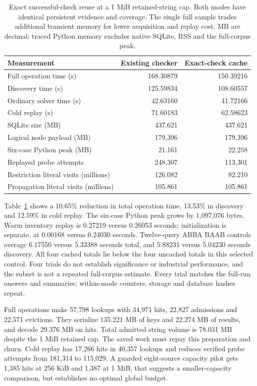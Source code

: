 \documentclass[11pt,a4paper]{article}
\numberwithin{equation}{section}
\theoremstyle{plain}
\theoremstyle{definition}
\theoremstyle{remark}
\begin{document}
\begin{table}[t]
\centering
\small
\begin{tabular}{lrr}
\toprule
Measurement & Existing checker & Exact-check cache \\
\midrule
Full operation time (s) & 168.30879 & 150.39216 \\
Discovery time (s) & 125.59834 & 108.60557 \\
Ordinary solver time (s) & 42.63160 & 41.72166 \\
Cold replay (s) & 71.60183 & 62.58623 \\
SQLite size (MB) & 437.621 & 437.621 \\
Logical node payload (MB) & 179.396 & 179.396 \\
Six-case Python peak (MB) & 21.161 & 22.258 \\
Replayed probe attempts & 248,307 & 113,301 \\
Restriction literal visits (millions) & 126.082 & 82.210 \\
Propagation literal visits (millions) & 105.861 & 105.861 \\
\bottomrule
\end{tabular}
\caption{Exact successful-check reuse at a 1 MiB retained-string cap. Both modes have identical persistent evidence and coverage. The single full sample trades additional transient memory for lower acquisition and replay cost. MB are decimal; traced Python memory excludes native SQLite, RSS and the full-corpus peak.}
\label{tab:checked-probe-reuse}
\end{table}

Table~\ref{tab:checked-probe-reuse} shows a 10.65\% reduction in total operation time, 13.53\% in discovery and 12.59\% in cold replay. The six-case Python peak grows by 1,097,076 bytes. Warm inventory replay is 0.27219 versus 0.26053 seconds; initialization is separate, at 0.00168 versus 0.24030 seconds. Twelve-query ABBA BAAB controls average 6.17550 versus 5.33388 seconds total, and 5.88231 versus 5.04230 seconds discovery. All four cached totals lie below the four uncached totals in this selected control. Four trials do not establish significance or industrial performance, and the subset is not a repeated full-corpus estimate. Every trial matches the full-run answers and summaries; within-mode counters, storage and database hashes repeat.

Full operations make 57,798 lookups with 34,971 hits, 22,827 admissions and 22,571 evictions. They serialize 135.221 MB of keys and 22.274 MB of results, and decode 29.376 MB on hits. Total admitted string volume is 78.031 MB despite the 1 MiB retained cap. The saved work must repay this preparation and churn. Cold replay has 17,266 hits in 40,357 lookups and reduces verified probe attempts from 181,314 to 115,029. A guarded eight-source capacity pilot gets 1,385 hits at 256 KiB and 1,387 at 1 MiB; that suggests a smaller-capacity comparison, but establishes no optimal global budget.
\end{document}
